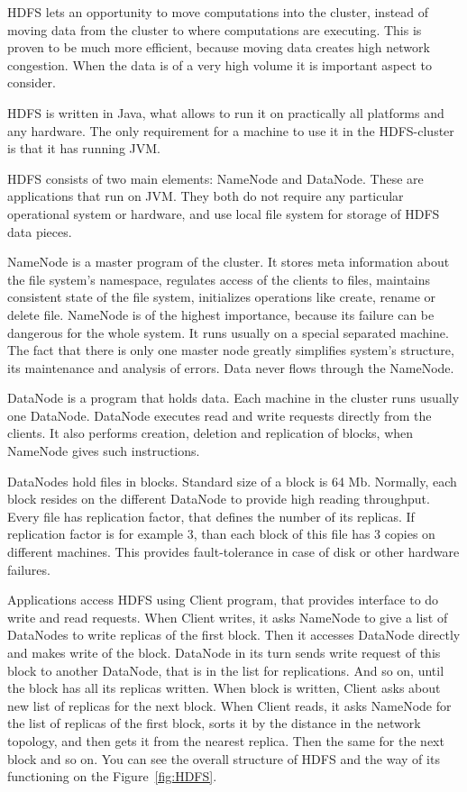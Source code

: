 HDFS lets an opportunity to move computations into the cluster, instead of moving data from the cluster to where computations are executing.
This is proven to be much more efficient, because moving data creates high network congestion.
When the data is of a very high volume it is important aspect to consider.

HDFS is written in Java, what allows to run it on practically all platforms and any hardware.
The only requirement for a machine to use it in the HDFS-cluster is that it has running JVM.


HDFS consists of two main elements: NameNode and DataNode.
These are applications that run on JVM.
They both do not require any particular operational system or hardware, and use local file system for storage of HDFS data pieces.

NameNode is a master program of the cluster.
It stores meta information about the file system's namespace, regulates access of the clients to files, maintains consistent state of the file system, initializes operations like create, rename or delete file.
NameNode is of the highest importance, because its failure can be dangerous for the whole system.
It runs usually on a special separated machine.
The fact that there is only one master node greatly simplifies system's structure, its maintenance and analysis of errors.
Data never flows through the NameNode.

DataNode is a program that holds data.
Each machine in the cluster runs usually one DataNode.
DataNode executes read and write requests directly from the clients.
It also performs creation, deletion and replication of blocks, when NameNode gives such instructions.

DataNodes hold files in blocks.
Standard size of a block is 64 Mb.
Normally, each block resides on the different DataNode to provide high reading throughput.
Every file has replication factor, that defines the number of its replicas.
If replication factor is for example 3, than each block of this file has 3 copies on different machines.
This provides fault-tolerance in case of disk or other hardware failures.

Applications access HDFS using Client program, that provides interface to do write and read requests.
When Client writes, it asks NameNode to give a list of DataNodes to write replicas of the first block.
Then it accesses DataNode directly and makes write of the block.
DataNode in its turn sends write request of this block to another DataNode, that is in the list for replications.
And so on, until the block has all its replicas written.
When block is written, Client asks about new list of replicas for the next block.
When Client reads, it asks NameNode for the list of replicas of the first block, sorts it by the distance in the network topology, and then gets it from the nearest replica.
Then the same for the next block and so on.
You can see the overall structure of HDFS and the way of its functioning on the Figure~\ref{fig:HDFS}.

